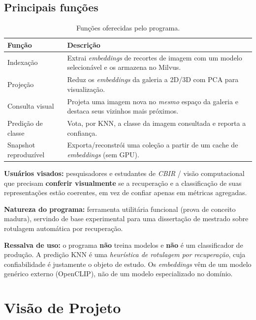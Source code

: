 \documentclass[10pt]{article}
\begin{document}
\subsection*{Principais funções}

\begin{table}[H]
\centering
\begin{tabular}{@{}p{3.2cm}p{11cm}@{}}
\toprule
\textbf{Função} & \textbf{Descrição} \\
\midrule
Indexação & Extrai \emph{embeddings} de recortes de imagem com um modelo selecionável e os armazena no Milvus. \\
Projeção & Reduz os \emph{embeddings} da galeria a 2D/3D com PCA para visualização. \\
Consulta visual & Projeta uma imagem nova no \emph{mesmo} espaço da galeria e destaca seus vizinhos mais próximos. \\
Predição de classe & Vota, por KNN, a classe da imagem consultada e reporta a confiança. \\
Snapshot reproduzível & Exporta/reconstrói uma coleção a partir de um cache de \emph{embeddings} (sem GPU). \\
\bottomrule
\end{tabular}
\caption{Funções oferecidas pelo programa.}
\end{table}

\noindent\textbf{Usuários visados:} pesquisadores e estudantes de \emph{CBIR} /
visão computacional que precisam \textbf{conferir visualmente} se a recuperação
e a classificação de suas representações estão coerentes, em vez de confiar
apenas em métricas agregadas.

\medskip
\noindent\textbf{Natureza do programa:} ferramenta utilitária funcional (prova
de conceito madura), servindo de base experimental para uma dissertação de
mestrado sobre rotulagem automática por recuperação.

\medskip
\noindent\textbf{Ressalva de uso:} o programa \textbf{não} treina modelos e
\textbf{não} é um classificador de produção. A predição KNN é uma
\emph{heurística de rotulagem por recuperação}, cuja confiabilidade é justamente
o objeto de estudo. Os \emph{embeddings} vêm de um modelo genérico externo
(OpenCLIP), não de um modelo especializado no domínio.

\section{Visão de Projeto}
\end{document}
